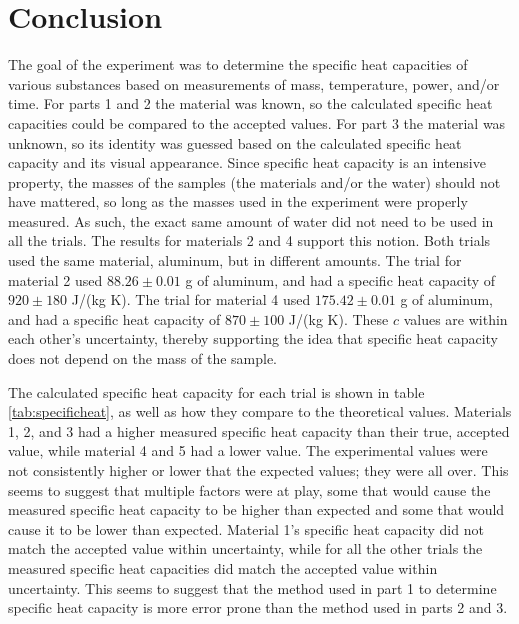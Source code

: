 \documentclass[12pt]{iopart} %
\begin{document}
\section{Conclusion}

The goal of the experiment was to determine the specific heat capacities of various substances based on measurements of mass, temperature, power, and/or time.
For parts 1 and 2 the material was known, so the calculated specific heat capacities could be compared to the accepted values.
For part 3 the material was unknown, so its identity was guessed based on the calculated specific heat capacity and its visual appearance.
Since specific heat capacity is an intensive property, the masses of the samples (the materials and/or the water) should not have mattered, so long as the masses used in the experiment were properly measured.
As such, the exact same amount of water did not need to be used in all the trials.
The results for materials 2 and 4 support this notion.
Both trials used the same material, aluminum, but in different amounts.
The trial for material 2 used $88.26 \pm 0.01$ g of aluminum, and had a specific heat capacity of $920 \pm 180$ J/(kg K).
The trial for material 4 used $175.42 \pm 0.01$ g of aluminum, and had a specific heat capacity of $870 \pm 100$ J/(kg K).
These $c$ values are within each other's uncertainty, thereby supporting the idea that specific heat capacity does not depend on the mass of the sample.

The calculated specific heat capacity for each trial is shown in table \ref{tab:specificheat}, as well as how they compare to the theoretical values.
Materials 1, 2, and 3 had a higher measured specific heat capacity than their true, accepted value, while material 4 and 5 had a lower value.
The experimental values were not consistently higher or lower that the expected values; they were all over.
This seems to suggest that multiple factors were at play, some that would cause the measured specific heat capacity to be higher than expected and some that would cause it to be lower than expected.
Material 1's specific heat capacity did not match the accepted value within uncertainty, while for all the other trials the measured specific heat capacities did match the accepted value within uncertainty.
This seems to suggest that the method used in part 1 to determine specific heat capacity is more error prone than the method used in parts 2 and 3.
\end{document}
